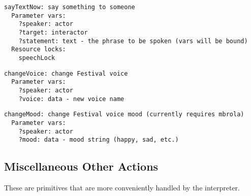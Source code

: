 \documentclass[11pt,letterpaper]{article}
\begin{document}
\begin{comment}



\end{comment}

\begin{Verbatim}
sayTextNow: say something to someone
  Parameter vars:
    ?speaker: actor
    ?target: interactor
    ?statement: text - the phrase to be spoken (vars will be bound)
  Resource locks:
    speechLock
\end{Verbatim}

\begin{Verbatim}
changeVoice: change Festival voice
  Parameter vars:
    ?speaker: actor
    ?voice: data - new voice name
\end{Verbatim}

\begin{Verbatim}
changeMood: change Festival voice mood (currently requires mbrola)
  Parameter vars:
    ?speaker: actor
    ?mood: data - mood string (happy, sad, etc.)
\end{Verbatim}

\subsection{Miscellaneous Other Actions}

These are primitives that are more conveniently handled by the
interpreter.
\end{document}
